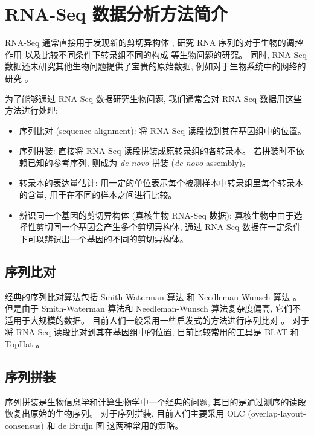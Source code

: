 \section{RNA-Seq 数据分析方法简介}
RNA-Seq 通常直接用于发现新的剪切异构体 
\cite{merkin2012evolutionary, wang2010novo, roberts2011identification, wang2010mapsplice}, 
研究 RNA 序列的对于生物的调控作用 \cite{van2011xuts}
以及比较不同条件下转录组不同的构成 \cite{trapnell2012differential}
等生物问题的研究。
同时, RNA-Seq 数据还未研究其他生物问题提供了宝贵的原始数据, 
例如对于生物系统中的网络的研究 \cite{shalek2013single,sinicropi2012whole}。 

为了能够通过 RNA-Seq 数据研究生物问题, 
我们通常会对 RNA-Seq 数据用这些方法进行处理:
\begin{itemize}
\item 序列比对 (sequence alignment): 将 RNA-Seq 读段找到其在基因组中的位置。

\item 序列拼装: 
直接将 RNA-Seq 读段拼装成原转录组的各转录本。 若拼装时不依赖已知的参考序列, 
则成为 \textit{de novo} 拼装 (\textit{de novo} assembly)。 

\item 转录本的表达量估计: 用一定的单位表示每个被测样本中转录组里每个转录本的含量, 
用于在不同的样本之间进行比较。

\item 辨识同一个基因的剪切异构体 (真核生物 RNA-Seq 数据): 真核生物中由于选择性剪切同一个基因会产生多个剪切异构体, 
通过 RNA-Seq 数据在一定条件下可以辨识出一个基因的不同的剪切异构体。
\end{itemize}

\subsection{序列比对}
经典的序列比对算法包括 Smith-Waterman 算法 \cite{SmithWaterman1981} 和 Needleman-Wunsch 算法 \cite{needleman1970general}。 
但是由于 Smith-Waterman 算法和 Needleman-Wunsch 算法复杂度偏高, 它们不适用于大规模的数据。 
目前人们一般采用一些启发式的方法进行序列比对 \cite{isaev2004introduction}。 
对于将 RNA-Seq 读段比对到其在基因组中的位置, 目前比较常用的工具是 
BLAT \cite{kent2002blat}
和 TopHat \cite{trapnell2009tophat}。

\subsection{序列拼装}
序列拼装是生物信息学和计算生物学中一个经典的问题, 
其目的是通过测序的读段恢复出原始的生物序列。 对于序列拼装, 目前人们主要采用 
OLC (overlap-layout-consensus) \cite{greenphrap, bonfield1995new, 
kececioglu1995combinatorial, myers1995toward, huang1999cap3}
和 de Bruijn 图 \cite{pevzner2001eulerian} 
这两种常用的策略。


